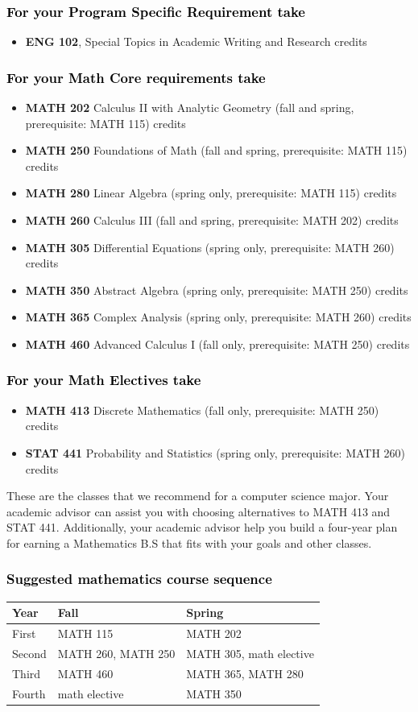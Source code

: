 \documentclass[11pt]{article}
\newcommand{\calconeshort}{MATH 115}
\newcommand{\calctwo}{\textbf{MATH 202} Calculus II with Analytic Geometry (fall and spring, prerequisite: MATH 115) \dotfill 5 credits }
\newcommand{\calctwoshort}{MATH 202}
\newcommand{\foundations}{\textbf{MATH 250} Foundations of Math (fall and spring, prerequisite: MATH 115)  \dotfill 3 credits}
\newcommand{\foundationsshort}{MATH 250}
\newcommand{\calcthree}{\textbf{MATH 260} Calculus III  (fall and spring, prerequisite: MATH 202) \dotfill 5 credits}
\newcommand{\calcthreeshort}{MATH 260}
\newcommand{\linear}{\textbf{MATH 280} Linear Algebra (spring only, prerequisite: MATH 115) \dotfill 3 credits}
\newcommand{\linearshort}{MATH 280}
\newcommand{\discrete}{\textbf{MATH 413} Discrete Mathematics  (fall only, prerequisite: MATH 250)\dotfill 3 credits}
\newcommand{\discreteshort}{MATH 413}
\newcommand{\statistics}{\textbf{STAT 441} Probability and Statistics (spring only, prerequisite: MATH 260)  \dotfill  3 credits}
\newcommand{\statisticsshort}{STAT 441}
\newcommand{\diffeq}{\textbf{MATH 305}	Differential Equations (spring only, prerequisite: MATH 260) \dotfill 	3 credits}
\newcommand{\diffeqshort}{MATH 305}
\newcommand{\abstractalgebra}{\textbf{MATH 350}	Abstract Algebra (spring only, prerequisite: MATH 250) \dotfill 	3 credits}
\newcommand{\abstractalgebrashort}{MATH 350}
\newcommand{\complex}{\textbf{MATH 365}	Complex Analysis (spring only,  prerequisite: MATH 260) \dotfill 3 credits}
\newcommand{\complexshort}{MATH 365}
\newcommand{\advancedcalc}{\textbf{MATH 460}	Advanced Calculus I  (fall only,   prerequisite: MATH 250) \dotfill 3 credits}
\newcommand{\advancedcalcshort}{MATH 460}
\newcommand{\mathBS}{
     \begin{center}
         \begin{tabular}[h]{| l | l | l|} 
            \hline
            \textbf{Year}           & \textbf{Fall}         &  \textbf{Spring}  \\ \hline 
            First & \calconeshort{}  & \calctwoshort \\  \hline
            Second &  \calcthreeshort{}, \foundationsshort & \diffeqshort, math elective \\ \hline
            Third & \advancedcalcshort              &  \complexshort{}, \linearshort \\ \hline
            Fourth & math elective &  \abstractalgebrashort  \\ \hline
         \end{tabular}
\end{center}}
\begin{document}
\subsubsection*{\textcolor{black}{For your Program Specific Requirement take}}

\begin{itemize}
   \item \textbf{ENG 102}, Special Topics in Academic Writing and Research  credits
\end{itemize}

	

\subsubsection*{\textcolor{black}{For your Math Core requirements take}}

\begin{itemize}
   \item \calctwo
   \item \foundations
   \item \linear
   \item \calcthree
   \item \diffeq
  \item \abstractalgebra
  \item \complex
  \item \advancedcalc
\end{itemize}



\subsubsection*{\textcolor{black}{For your  Math Electives take}}
\begin{itemize}
\item \discrete
\item \statistics
\end{itemize}
\vspace{0.1in}
These are the classes that we recommend for a computer science major.
Your academic advisor can assist you with choosing alternatives 
to \discreteshort{} and \statisticsshort{}. Additionally, your 
academic advisor help you build a four-year plan for earning a 
Mathematics B.S that fits with your goals and other classes.



\subsubsection*{\textcolor{black}{Suggested mathematics course sequence}}
   \mathBS
\end{document}

